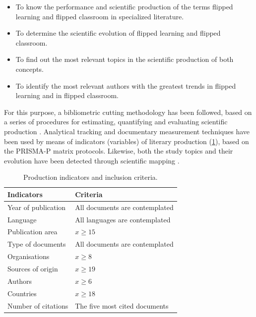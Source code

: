 \documentclass{textolivre-html}
\begin{document}
\begin{itemize}
    \item To know the performance and scientific production of the terms flipped learning and flipped classroom in specialized literature.
    \item To determine the scientific evolution of flipped learning and flipped classroom.
    \item To find out the most relevant topics in the scientific production of both concepts.
    \item To identify the most relevant authors with the greatest trends in flipped learning and in flipped classroom.
\end{itemize}

For this purpose, a bibliometric cutting methodology has been followed, based on a series of procedures for estimating, quantifying and evaluating scientific production \cite{martinez_analyzing_2015}. Analytical tracking and documentary measurement techniques have been used by means of indicators (variables) of literary production (\cref{tbl-tabela-01}), based on the PRISMA-P matrix protocols. Likewise, both the study topics and their evolution have been detected through scientific mapping \cite{lopez-robles_profesional_2019, lopez_belmonte_analysis_2019}.

\begin{table}[htpb]
\caption{Production indicators and inclusion criteria.}
\label{tbl-tabela-01}
\centering
\begin{tabular}{ll}
\toprule
\textbf{Indicators} & \textbf{Criteria}              \\ 
\midrule
Year of publication & All documents are contemplated \\ 
Language            & All languages are contemplated \\ 
Publication area    & $x \geq 15$                           \\ 
Type of documents   & All documents are contemplated \\ 
Organisations       & $x \geq 8$                            \\ 
Sources of origin   & $x \geq 19$                           \\ 
Authors             & $x \geq 6$                            \\ 
Countries           & $x \geq 18$                           \\ 
Number of citations & The five most cited documents  \\ 
\bottomrule
\end{tabular}
\end{table}
\end{document}
